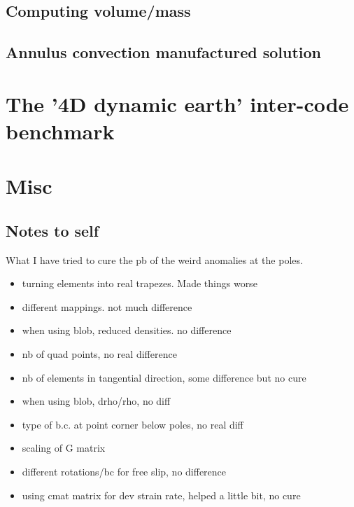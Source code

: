 \documentclass[a4paper,12pt]{article}
\begin{document}
\subsection{Computing volume/mass}



\subsection{Annulus convection manufactured solution}


\section{The '4D dynamic earth' inter-code benchmark}

\cite{krhb12}


\newpage
\appendix
\section{Misc}

\subsection{Notes to self}

What I have tried to cure the pb of the weird anomalies at the poles.

\begin{itemize}
\item turning elements into real trapezes. Made things worse
\item different mappings. not much difference
\item when using blob, reduced densities. no difference
\item nb of quad points, no real difference
\item nb of elements in tangential direction, some difference but no cure 
\item when using blob, drho/rho, no diff 
\item type of b.c. at point corner below poles, no real diff 
\item scaling of G matrix
\item different rotations/bc for free slip, no difference
\item using cmat matrix for dev strain rate, helped a little bit, no cure 
\end{itemize}
\end{document}
